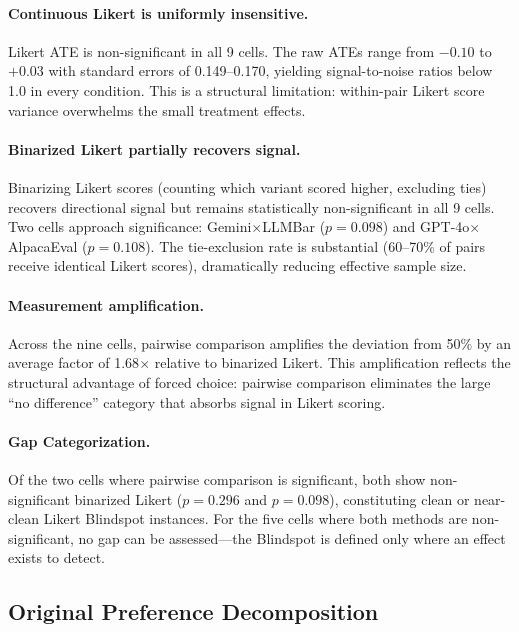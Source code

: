 \documentclass[11pt,a4paper]{article}
\begin{document}
\paragraph{Continuous Likert is uniformly insensitive.}
Likert ATE is non-significant in all 9 cells.
The raw ATEs range from $-0.10$ to $+0.03$ with standard errors of 0.149--0.170, yielding signal-to-noise ratios below 1.0 in every condition.
This is a structural limitation: within-pair Likert score variance overwhelms the small treatment effects.

\paragraph{Binarized Likert partially recovers signal.}
Binarizing Likert scores (counting which variant scored higher, excluding ties) recovers directional signal but remains statistically non-significant in all 9 cells.
Two cells approach significance: Gemini$\times$LLMBar ($p{=}0.098$) and GPT-4o$\times$AlpacaEval ($p{=}0.108$).
The tie-exclusion rate is substantial (60--70\% of pairs receive identical Likert scores), dramatically reducing effective sample size.

\paragraph{Measurement amplification.}
Across the nine cells, pairwise comparison amplifies the deviation from 50\% by an average factor of 1.68$\times$ relative to binarized Likert.
This amplification reflects the structural advantage of forced choice: pairwise comparison eliminates the large ``no difference'' category that absorbs signal in Likert scoring.

\paragraph{Gap Categorization.}
Of the two cells where pairwise comparison is significant, both show non-significant binarized Likert ($p{=}0.296$ and $p{=}0.098$), constituting clean or near-clean Likert Blindspot instances.
For the five cells where both methods are non-significant, no gap can be assessed---the Blindspot is defined only where an effect exists to detect.

\subsection{Original Preference Decomposition}
\label{sec:exp_confound}
\end{document}
